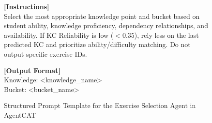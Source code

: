 \begin{figure}[htbp]
\begin{tcolorbox}
\vspace{0.8em}
\tcbline
\vspace{0.8em}

\textbf{[Instructions]} \\
Select the most appropriate knowledge point and bucket based on student ability, knowledge proficiency, dependency relationships, and availability. 
If KC Reliability is low ($<0.35$), rely less on the last predicted KC and prioritize ability/difficulty matching. Do not output specific exercise IDs.

\vspace{0.8em}
\textbf{[Output Format]} \\
Knowledge: \textless knowledge\_name\textgreater \\
Bucket: \textless bucket\_name\textgreater

\end{tcolorbox}
\caption{Structured Prompt Template for the Exercise Selection Agent in AgentCAT}
\label{selection_agent_prompt}
\end{figure}